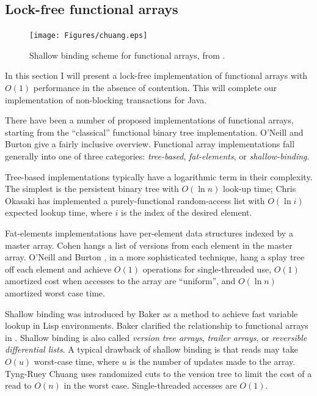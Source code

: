 \subsection{Lock-free functional arrays}\label{sec:large-obj}
\begin{figure}\centering
\texttt{[image: Figures/chuang.eps]}
\caption{Shallow binding scheme for functional arrays, from
  \cite[Figure~1]{Chuang94}.}
\label{fig:chuang}
\end{figure}
In this section I will present a lock-free implementation of functional
arrays with $O(1)$ performance in the absence of contention.  This
will complete our implementation of non-blocking transactions for Java.

There have been a number of proposed implementations of functional
arrays, starting from the ``classical'' functional binary tree
implementation.  O'Neill and Burton \cite{ONeillBu97} give a fairly
inclusive overview.  Functional array implementations fall generally
into one of three categories: \emph{tree-based}, \emph{fat-elements},
or \emph{shallow-binding}.

Tree-based implementations typically have a logarithmic term in their
complexity.  The simplest is the persistent binary tree with $O(\ln
n)$ look-up time; Chris Okasaki 
\cite{Okasaki95} has implemented a purely-functional random-access list
with $O(\ln i)$ expected lookup time, where $i$ is the index of the
desired element.

Fat-elements implementations have per-element data structures indexed
by a master array. Cohen \cite{Cohen84} hangs a list of
versions from each element in the master array.
O'Neill and Burton \cite{ONeillBu97}, in a more sophisticated
technique, hang a splay tree off each element and achieve $O(1)$
operations for single-threaded use, $O(1)$ amortized cost when
accesses to the array are ``uniform'', and $O(\ln n)$ amortized worst
case time. 

Shallow binding was introduced by Baker \cite{Baker78} as a method to
achieve fast variable lookup in Lisp environments.  Baker clarified
the relationship to functional arrays in \cite{Baker91}.  Shallow
binding is also called \emph{version tree arrays}, \emph{trailer
  arrays}, or \emph{reversible differential lists}.  A typical
drawback of shallow binding is that reads may take $O(u)$ worst-case
time, where $u$ is the number of updates made to the array.  Tyng-Ruey
Chuang \cite{Chuang94} uses randomized cuts to the version tree to limit
the cost of a read to $O(n)$ in the worst case.  Single-threaded
accesses are $O(1)$.

